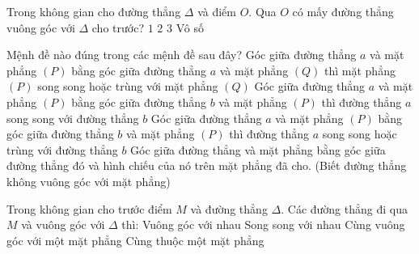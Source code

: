 \begin{ex}%
	Trong  không gian cho đường thẳng $\Delta$ và điểm $O$. Qua $O$ có mấy đường thẳng vuông góc với $\Delta$ cho trước?
	 \choice
		 {$1$}
		{$2$} 
		{$3$} 
		 {\True Vô số}
\end{ex}

\begin{ex}%
	Mệnh  đề nào đúng trong các mệnh đề sau đây?
	\choice 
		{Góc giữa đường thẳng $a$ và mặt phẳng $(P)$ bằng góc giữa đường thẳng $a$ và mặt phẳng $(Q)$ thì mặt phẳng  $(P)$ song song hoặc trùng với mặt phẳng $(Q)$}
		{Góc giữa đường thẳng $a$ và mặt phẳng $(P)$ bằng góc giữa đường thẳng $b$ và  mặt phẳng $(P)$ thì đường thẳng $a$ song song với đường thẳng $b$}
		{Góc giữa đường  thẳng $a$ và mặt phẳng $(P)$ bằng góc giữa đường thẳng $b$ và mặt phẳng $(P)$ thì đường thẳng $a$ song song hoặc trùng với đường thẳng $b$}
		{\True Góc giữa đường thẳng và mặt phẳng bằng góc giữa đường thẳng đó và hình chiếu của nó trên mặt phẳng đã cho. (Biết đường thẳng không vuông góc với  mặt phẳng)}
\end{ex}

\begin{ex}%
	Trong không gian cho trước điểm $M$ và đường thẳng $\Delta $. Các đường thẳng đi qua  $M$ và vuông góc với $\Delta $ thì:
	 \choice
		{Vuông góc với  nhau}
		{Song  song với nhau}
		{Cùng vuông góc với một mặt phẳng} 
		{\True Cùng  thuộc một mặt phẳng}
\end{ex}

